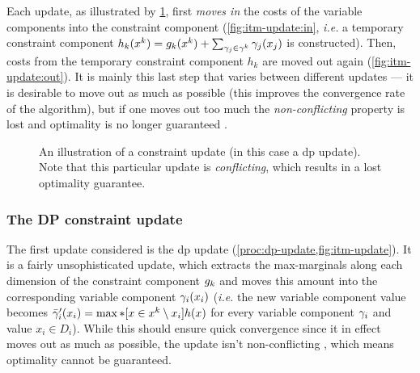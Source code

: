 Each update, as illustrated by \cref{fig:itm-update}, first \emph{moves in} the costs of the variable components into the constraint component (\cref{fig:itm-update:in}, \emph{i.e.} a temporary constraint component \(h_k(x^k) = g_k(x^k) + \sum_{\gamma_j \in \gamma^k} \gamma_j(x_j)\) is constructed).
Then, costs from the temporary constraint component \(h_k\) are moved out again (\cref{fig:itm-update:out}).
It is mainly this last step that varies between different updates --- it is desirable to move out as much as possible (this improves the convergence rate of the algorithm), but if one moves out too much the \emph{non-conflicting} property is lost and optimality is no longer guaranteed \parencites[\pno~105]{Wedelin08}[\pno~15]{Wedelin13}.

\begin{figure}[tbp]
	\centering
	\hfil
	\hfil
	\caption{An illustration of a constraint update (in this case a \gls{dp} update). Note that this particular update is \emph{conflicting}, which results in a lost optimality guarantee.}
	\label{fig:itm-update}
\end{figure}

\subsubsection{The DP constraint update}
The first update considered is the \gls{dp} update (\cref{proc:dp-update,fig:itm-update}).
It is a fairly unsophisticated update, which extracts the max-marginals along each dimension of the constraint component \(g_k\) and moves this amount into the corresponding variable component \(\gamma_i(x_i)\) (\emph{i.e.} the new variable component value becomes \(\bar{\gamma}'_i(x_i) = \max*[x\in x^k\setminus x_i]{h(x)}\) for every variable component \(\gamma_i\) and value \(x_i\in D_i\)).
While this should ensure quick convergence since it in effect moves out as much as possible, the update isn't non-conflicting \parencite[\pno~105]{Wedelin08}, which means optimality cannot be guaranteed.

